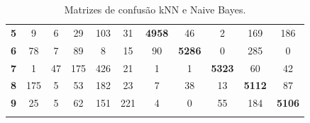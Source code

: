 \documentclass[
	12pt,				%
	openright,			%
	twoside,			%
	a4paper,			%
	english,			%
	brazil,				%
	svgnames
	]{abntex2}\usepackage[]{graphicx}\usepackage[]{color}
\begin{document}
\begin{table}[h]
\begin{tabular}{rcccccccccc}
\multicolumn{1}{r|}{\textbf{5}}           & 9                                  & 6                                  & 29                                 & 103                                & \multicolumn{1}{c|}{31}            & \multicolumn{1}{c|}{\textbf{4958}} & 46                                 & 2                                  & 169                                & 186                                \\ \cline{7-8}
\multicolumn{1}{r|}{\textbf{6}}           & 78                                 & 7                                  & 89                                 & 8                                  & 15                                 & \multicolumn{1}{c|}{90}            & \multicolumn{1}{c|}{\textbf{5286}} & 0                                  & 285                                & 0                                  \\ \cline{8-9}
\multicolumn{1}{r|}{\textbf{7}}           & 1                                  & 47                                 & 175                                & 426                                & 21                                 & 1                                  & \multicolumn{1}{c|}{1}             & \multicolumn{1}{c|}{\textbf{5323}} & 60                                 & 42                                 \\ \cline{9-10}
\multicolumn{1}{r|}{\textbf{8}}           & 175                                & 5                                  & 53                                 & 182                                & 23                                 & 7                                  & 38                                 & \multicolumn{1}{c|}{13}            & \multicolumn{1}{c|}{\textbf{5112}} & 87                                 \\ \cline{10-11} 
\multicolumn{1}{r|}{\textbf{9}}           & 25                                 & 5                                  & 62                                 & 151                                & 221                                & 4                                  & 0                                  & 55                                 & \multicolumn{1}{c|}{184}           & \multicolumn{1}{c|}{\textbf{5106}} \\ \hline
\textbf{}                                 &                                    &                                    &                                    &                                    &                                    &                                    &                                    &                                    &                                    &                                   
\end{tabular}
\caption{Matrizes de confusão kNN e Naive Bayes.}
\label{tab:cm1}
\end{table}
\end{document}
